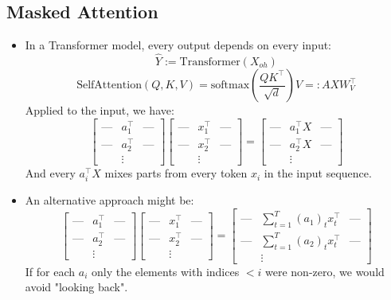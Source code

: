 \documentclass{article}
\begin{document}
\subsection*{Masked Attention}
\begin{itemize}
    \item In a Transformer model, every output depends on every input:
        $$\hat{Y} := \mathrm{Transformer}(X_{oh})$$
        $$\mathrm{SelfAttention}(Q, K, V) = \mathrm{softmax}\left(\frac{QK^\intercal}{\sqrt{d}}\right)V =: A X W_V^\intercal$$
        Applied to the input, we have:
        $$\begin{bmatrix}
            \text{---} & a_1^\intercal & \text{---} \\
            \text{---} & a_2^\intercal & \text{---} \\
            &\vdots&
        \end{bmatrix}
        \begin{bmatrix}
            \text{---} & x_1^\intercal & \text{---} \\
            \text{---} & x_2^\intercal & \text{---} \\
            &\vdots&
        \end{bmatrix}
        = \begin{bmatrix}
            \text{---} & a_1^\intercal X & \text{---} \\
            \text{---} & a_2^\intercal X & \text{---} \\
            &\vdots&
        \end{bmatrix}$$
        And every $a_i^\intercal X$ mixes parts from every token $x_i$ in the input sequence.

    \item An alternative approach might be:
        $$\begin{bmatrix}
            \text{---} & a_1^\intercal & \text{---} \\
            \text{---} & a_2^\intercal & \text{---} \\
            &\vdots&
        \end{bmatrix}
        \begin{bmatrix}
            \text{---} & x_1^\intercal & \text{---} \\
            \text{---} & x_2^\intercal & \text{---} \\
            &\vdots&
        \end{bmatrix}
        = \begin{bmatrix}
            \text{---} & \sum_{t=1}^T (a_1)_t x_t^\intercal & \text{---} \\
            \text{---} & \sum_{t=1}^T (a_2)_t x_t^\intercal & \text{---} \\
            &\vdots&
        \end{bmatrix}$$
        If for each $a_i$ only the elements with indices $<i$ were non-zero, we would avoid "looking back".


\end{itemize}
\end{document}

